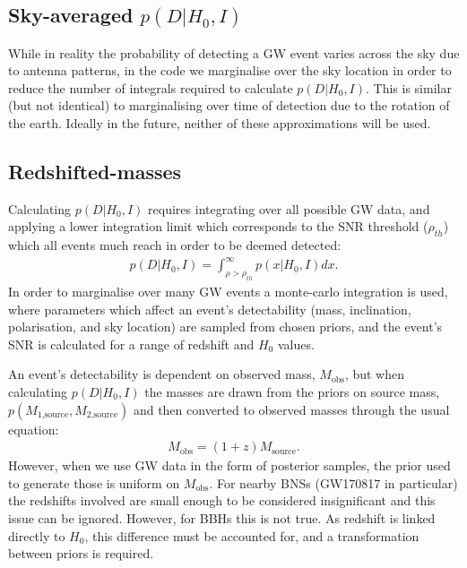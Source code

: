 \documentclass[a4paper,10pt]{article}
\begin{document}
\subsection{Sky-averaged \boldmath$p(D|H_0,I)$}
While in reality the probability of detecting a GW event varies across the sky due to antenna patterns, in the code we marginalise over the sky location in order to reduce the number of integrals required to calculate $p(D|H_0,I)$.  This is similar (but not identical) to marginalising over time of detection due to the rotation of the earth.  Ideally in the future, neither of these approximations will be used.


\subsection{Redshifted-masses}
Calculating $p(D|H_0,I)$ requires integrating over all possible GW data, and applying a lower integration limit which corresponds to the SNR threshold ($\rho_{th}$) which all events much reach in order to be deemed detected:
\begin{equation}
\begin{aligned}
p(D|H_0,I) = \int_{\rho>\rho_{th}}^\infty p(x|H_0,I)dx.
\end{aligned}
\end{equation}
In order to marginalise over many GW events a monte-carlo integration is used, where parameters which affect an event's detectability (mass, inclination, polarisation, and sky location) are sampled from chosen priors, and the event's SNR is calculated for a range of redshift and $H_0$ values.

An event's detectability is dependent on observed mass, $M_{\text{obs}}$, but when calculating $p(D|H_0,I)$ the masses are drawn from the priors on source mass, $p(M_{\text{1,source}},M_{\text{2,source}})$ and then converted to observed masses through the usual equation:
\begin{equation}
\begin{aligned}
M_{\text{obs}} = (1+z)M_{\text{source}}.
\end{aligned}
\end{equation}
However, when we use GW data in the form of posterior samples, the prior used to generate those is uniform on $M_{\text{obs}}$.  For nearby BNSs (GW170817 in particular) the redshifts involved are small enough to be considered insignificant and this issue can be ignored.  However, for BBHs this is not true.  As redshift is linked directly to $H_0$, this difference must be accounted for, and a transformation between priors is required.
\end{document}
